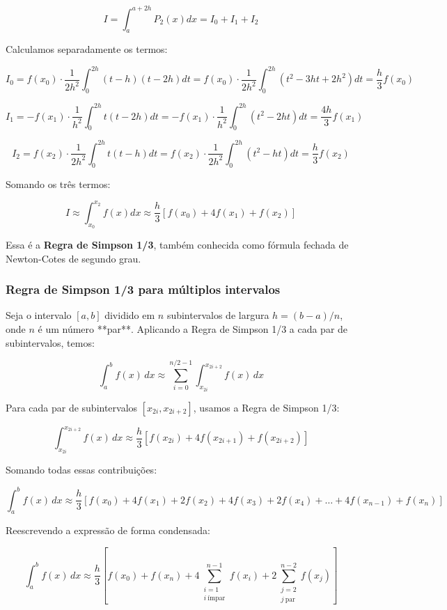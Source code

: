 \documentclass[12pt]{article}
\begin{document}
\[
I = \int_a^{a+2h} P_2(x) dx = I_0 + I_1 + I_2
\]

Calculamos separadamente os termos:

\[
I_0 = f(x_0) \cdot \frac{1}{2h^2} \int_0^{2h} (t - h)(t - 2h) dt
= f(x_0) \cdot \frac{1}{2h^2} \int_0^{2h} (t^2 - 3ht + 2h^2) dt
= \frac{h}{3} f(x_0)
\]

\[
I_1 = -f(x_1) \cdot \frac{1}{h^2} \int_0^{2h} t(t - 2h) dt
= -f(x_1) \cdot \frac{1}{h^2} \int_0^{2h} (t^2 - 2ht) dt
= \frac{4h}{3} f(x_1)
\]

\[
I_2 = f(x_2) \cdot \frac{1}{2h^2} \int_0^{2h} t(t - h) dt
= f(x_2) \cdot \frac{1}{2h^2} \int_0^{2h} (t^2 - ht) dt
= \frac{h}{3} f(x_2)
\]

Somando os três termos:

\[
I \approx \int_{x_0}^{x_2} f(x) dx \approx \frac{h}{3} \left[ f(x_0) + 4f(x_1) + f(x_2) \right]
\]

Essa é a \textbf{Regra de Simpson 1/3}, também conhecida como fórmula fechada de Newton-Cotes de segundo grau.

\subsubsection*{Regra de Simpson 1/3 para múltiplos intervalos}

Seja o intervalo $[a, b]$ dividido em $n$ subintervalos de largura $h = (b - a)/n$, onde $n$ é um número **par**. Aplicando a Regra de Simpson 1/3 a cada par de subintervalos, temos:

\[
\int_a^b f(x)\,dx \approx \sum_{i=0}^{n/2 - 1} \int_{x_{2i}}^{x_{2i+2}} f(x)\,dx
\]

Para cada par de subintervalos $[x_{2i}, x_{2i+2}]$, usamos a Regra de Simpson 1/3:

\[
\int_{x_{2i}}^{x_{2i+2}} f(x)\,dx \approx \frac{h}{3} \left[f(x_{2i}) + 4f(x_{2i+1}) + f(x_{2i+2})\right]
\]

Somando todas essas contribuições:

\[
\int_a^b f(x)\,dx \approx \frac{h}{3} \left[f(x_0) + 4f(x_1) + 2f(x_2) + 4f(x_3) + 2f(x_4) + \dots + 4f(x_{n-1}) + f(x_n)\right]
\]

Reescrevendo a expressão de forma condensada:

\[
\int_a^b f(x)\,dx \approx \frac{h}{3} \left[
f(x_0) + f(x_n)
+ 4 \sum_{\substack{i = 1 \\ i\ \text{ímpar}}}^{n-1} f(x_i)
+ 2 \sum_{\substack{j = 2 \\ j\ \text{par}}}^{n-2} f(x_j)
\right]
\]
\end{document}
